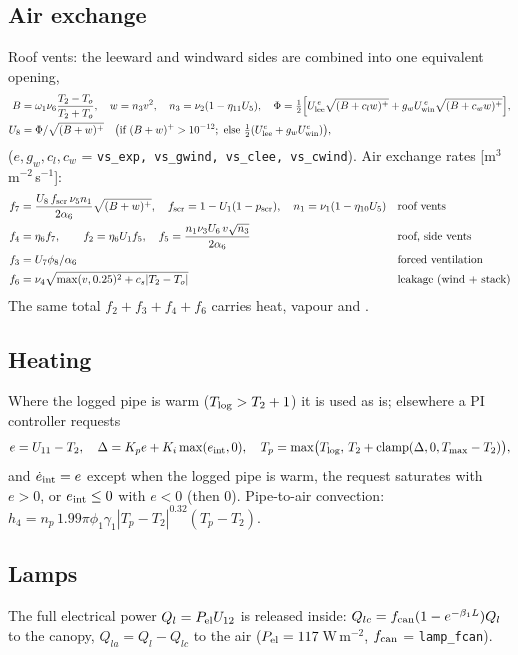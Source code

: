 \documentclass[11pt,a4paper]{article}
\newcommand{\code}[1]{\texttt{#1}}
\begin{document}
\subsection{Air exchange}\label{sec:vent}
Roof vents: the leeward and windward sides are combined into one equivalent opening,
\begin{align}
B&=\omega_1\nu_6\frac{T_2-T_o}{T_2+T_o},\quad w=n_3v^2,\quad n_3=\nu_2(1-\eta_{11}U_5),\quad
\Phi=\tfrac12\Bigl[U_{\rm lee}^{\,e}\sqrt{(B+c_lw)^+}+g_wU_{\rm win}^{\,e}\sqrt{(B+c_ww)^+}\Bigr],\\
U_8&=\Phi/\sqrt{(B+w)^+}\quad\bigl(\text{if }(B+w)^+>10^{-12};\ \text{else }\tfrac12(U_{\rm lee}^e+g_wU_{\rm win}^e)\bigr),
\end{align}
($e,g_w,c_l,c_w$ = \code{vs\_exp, vs\_gwind, vs\_clee, vs\_cwind}). Air exchange rates [m$^3$\,m$^{-2}$\,s$^{-1}$]:
\begin{align}
f_7&=\frac{U_8\,f_{\rm scr}\,\nu_5n_1}{2\alpha_6}\sqrt{(B+w)^+},\quad f_{\rm scr}=1-U_1(1-p_{\rm scr}),\quad n_1=\nu_1(1-\eta_{10}U_5) &&\text{roof vents}\\
f_4&=\eta_6f_7,\qquad f_2=\eta_6U_1f_5,\quad f_5=\frac{n_1\nu_3U_6\,v\sqrt{n_3}}{2\alpha_6} &&\text{roof, side vents}\\
f_3&=U_7\phi_8/\alpha_6 &&\text{forced ventilation}\\
f_6&=\nu_4\sqrt{\max(v,0.25)^2+c_s|T_2-T_o|} &&\text{leakage (wind + stack)}
\end{align}
The same total $f_2+f_3+f_4+f_6$ carries heat, vapour and .

\subsection{Heating}\label{sec:heat}
Where the logged pipe is warm ($T_{\rm log}>T_2+1$) it is used as is; elsewhere a PI controller requests
\begin{equation}\label{eq:pi}
e=U_{11}-T_2,\quad \Delta=K_pe+K_i\max(e_{\rm int},0),\quad T_p=\max\bigl(T_{\rm log},\,T_2+\mathrm{clamp}(\Delta,0,T_{\max}-T_2)\bigr),
\end{equation}
and $\dot e_{\rm int}=e$ except when the logged pipe is warm, the request saturates with $e>0$, or $e_{\rm int}\le0$ with $e<0$ (then 0).
Pipe-to-air convection: $h_4=n_p\,1.99\pi\phi_1\gamma_1|T_p-T_2|^{0.32}(T_p-T_2)$.

\subsection{Lamps}
The full electrical power $Q_l=P_{\rm el}U_{12}$ is released inside: $Q_{lc}=f_{\rm can}(1-e^{-\beta_1L})Q_l$ to the canopy,
$Q_{la}=Q_l-Q_{lc}$ to the air ($P_{\rm el}=117$\,W\,m$^{-2}$, $f_{\rm can}$ = \code{lamp\_fcan}).
\end{document}

